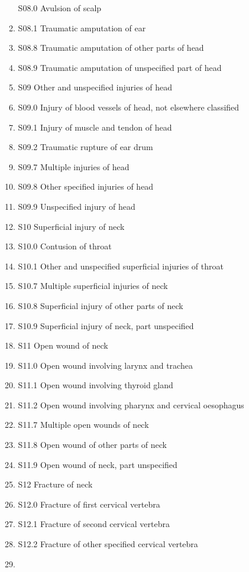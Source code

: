 \documentclass[
]{scrartcl}
\begin{document}
\begin{itemize}
\begin{enumerate}
    S08.0 Avulsion of scalp
  \item
    S08.1 Traumatic amputation of ear
  \item
    S08.8 Traumatic amputation of other parts of head
  \item
    S08.9 Traumatic amputation of unspecified part of head
  \item
    S09 Other and unspecified injuries of head
  \item
    S09.0 Injury of blood vessels of head, not elsewhere classified
  \item
    S09.1 Injury of muscle and tendon of head
  \item
    S09.2 Traumatic rupture of ear drum
  \item
    S09.7 Multiple injuries of head
  \item
    S09.8 Other specified injuries of head
  \item
    S09.9 Unspecified injury of head
  \item
    S10 Superficial injury of neck
  \item
    S10.0 Contusion of throat
  \item
    S10.1 Other and unspecified superficial injuries of throat
  \item
    S10.7 Multiple superficial injuries of neck
  \item
    S10.8 Superficial injury of other parts of neck
  \item
    S10.9 Superficial injury of neck, part unspecified
  \item
    S11 Open wound of neck
  \item
    S11.0 Open wound involving larynx and trachea
  \item
    S11.1 Open wound involving thyroid gland
  \item
    S11.2 Open wound involving pharynx and cervical oesophagus
  \item
    S11.7 Multiple open wounds of neck
  \item
    S11.8 Open wound of other parts of neck
  \item
    S11.9 Open wound of neck, part unspecified
  \item
    S12 Fracture of neck
  \item
    S12.0 Fracture of first cervical vertebra
  \item
    S12.1 Fracture of second cervical vertebra
  \item
    S12.2 Fracture of other specified cervical vertebra
  \item

\end{enumerate}
\end{itemize}
\end{document}

